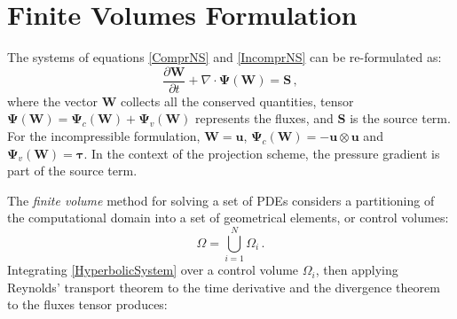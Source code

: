 \documentclass[11pt, a4paper, oneside, openany]{book}
\begin{document}
\section{Finite Volumes Formulation}\label{Chapter_Solver_Section_Finite_Volumes_Formulation}

The systems of equations \eqref{ComprNS} and \eqref{IncomprNS} can be re-formulated as:
\begin{equation}
\dfrac{\partial\boldsymbol{W}}{\partial t}+\nabla\cdot\boldsymbol{\Psi}\left(\boldsymbol{W}\right)=\boldsymbol{S}\,,\label{HyperbolicSystem}
\end{equation}
where the vector $\boldsymbol{W}$ collects all the conserved quantities, tensor $\boldsymbol{\Psi}\left(\boldsymbol{W}\right)=\boldsymbol{\Psi}_{c}\left(\boldsymbol{W}\right)+\boldsymbol{\Psi}_{v}\left(\boldsymbol{W}\right)$ represents the fluxes, and $\boldsymbol{S}$ is the source term.  For the incompressible formulation, $\boldsymbol{W}= \boldsymbol{u}$, $\boldsymbol{\Psi}_{c}\left(\boldsymbol{W}\right)=-\boldsymbol{u}\otimes\boldsymbol{u}$ and $\boldsymbol{\Psi}_{v}\left(\boldsymbol{W}\right)=\boldsymbol{\tau}$. In the context of the projection scheme, the pressure gradient is part of the source term.\par
The \textit{finite volume} method for solving a set of PDEs considers a partitioning of the computational domain into a set of geometrical elements, or control volumes:
\begin{equation}
\Omega=\bigcup_{i=1}^{N}\Omega_{i}\,.
\end{equation}
Integrating \eqref{HyperbolicSystem} over a control volume $\Omega_{i}$, then applying Reynolds' transport theorem to the time derivative and the divergence theorem to the fluxes tensor produces:
\end{document}
